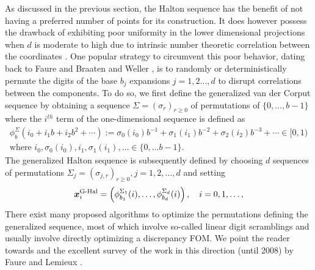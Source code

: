 \documentclass{svproc}
\newcounter{algorithm}%
\begin{document}
As discussed in the previous section, the Halton sequence has the benefit of not having a preferred number of points for its construction. It does however possess the drawback of exhibiting poor uniformity in the lower dimensional projections when $d$ is moderate to high due to intrinsic number theoretic correlation between the coordinates \cite{kirklem24}. One popular strategy to circumvent this poor behavior, dating back to Faure \cite{fau78} and Braaten and Weller \cite{brawell79}, is to randomly or deterministically permute the digits of the base $b_j$ expansions $j = 1,2\ldots,d$ to disrupt correlations between the components. To do so, we first define the generalized van der Corput sequence by obtaining a sequence $\Sigma = (\sigma_r)_{r\geq0}$ of permutations of $\{0,\ldots,b-1\}$ where the $i^{th}$ term of the one-dimensional sequence is defined as 
\begin{multline}\label{eq:gen_vdc}
    \phi_b^{\Sigma}(i_0 + i_1b + i_2 b^2 + \cdots ) := \sigma_0(i_0) b^{-1} + \sigma_1(i_1) b^{-2} + \sigma_2(i_2) b^{-3} + \cdots \in [0,1)
	\\
	 \text{where } i_0, \sigma_0(i_0), i_1, \sigma_1(i_1), \ldots \in \{0,\ldots b-1\}.
\end{multline}
The generalized Halton sequence is subsequently defined by choosing $d$ sequences of permutations $\Sigma_j = (\sigma_{j,r})_{r\geq0}, j = 1, 2,\ldots,d$ and setting
$${\boldsymbol{x}}_i^{\text{G-Hal}} = \left( \phi^{\Sigma_1}_{b_1}(i), \ldots, \phi^{\Sigma_d}_{b_d}(i)\right), \quad i= 0,1,\ldots,$$
There exist many proposed algorithms to optimize the permutations defining the generalized sequence, most of which involve so-called linear digit scramblings and usually involve directly optimizing a discrepancy FOM. We point the reader towards \cite{MasChiWar05,tuffin98,Atan04,vancools06} and the excellent survey of the work in this direction (until 2008) by Faure and Lemieux \cite{faulem09}.
\end{document}
